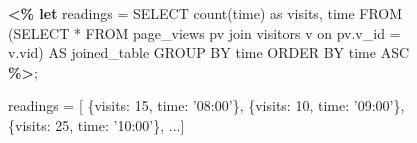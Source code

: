 \begin{figure}[hbt!]
 \centering
 \begin{minipage}[c]{7cm}
 \begin{minipage}[c]{7cm}
 \begin{code}
 \textbf{<\% let} readings = 
    SELECT count(time) as visits, time
    FROM (SELECT * FROM page_views pv 
   	     join visitors v 
          on pv.v_id = v.vid) AS joined_table
    GROUP BY time 
    ORDER BY time ASC \textbf{\%>};
 \end{code}
 \vspace*{-0.4cm}
 \label{figure:first-running-example:data-retrieval}
 \vspace*{0.3cm}
 \end{minipage}
 
 
 
 \begin{minipage}[c]{7cm}
 \begin{code}
 readings = [
    \{visits: 15, time: '08:00'\}, 
    \{visits: 10, time: '09:00'\},
    \{visits: 25, time: '10:00'\},  ...]
 \end{code}
 \vspace*{-0.4cm}
 \label{figure:running-example:query-result}
 \vspace*{0.3cm}
 \end{minipage}
 

\end{minipage}
\end{figure}
